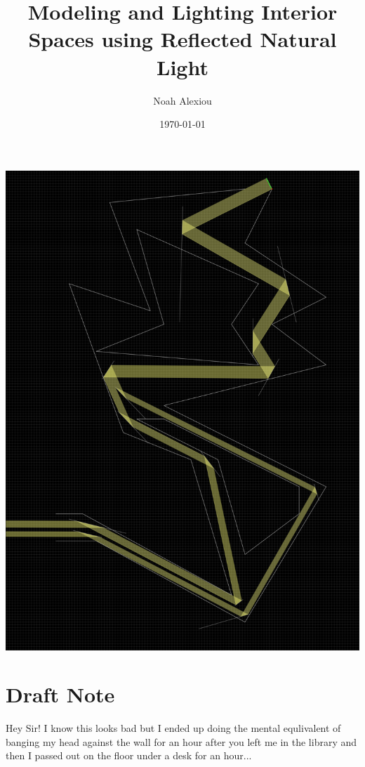 \documentclass[11pt, letterpaper]{article}
\begin{document}
\begin{titlepage}
	\title{Modeling and Lighting Interior Spaces using Reflected Natural Light}
	\author{Noah Alexiou}
	\date{\today}
	
	\maketitle
	\centering
	\includegraphics[width=15cm]{Images/Cave.png}
	
\end{titlepage}

\newpage
\tableofcontents


\newpage
\section{Draft Note}
Hey Sir!
I know this looks bad but I ended up doing the mental equlivalent of banging my head against the wall for an hour after you left me in the library and then I passed out on the floor under a desk for an hour...
\end{document}
